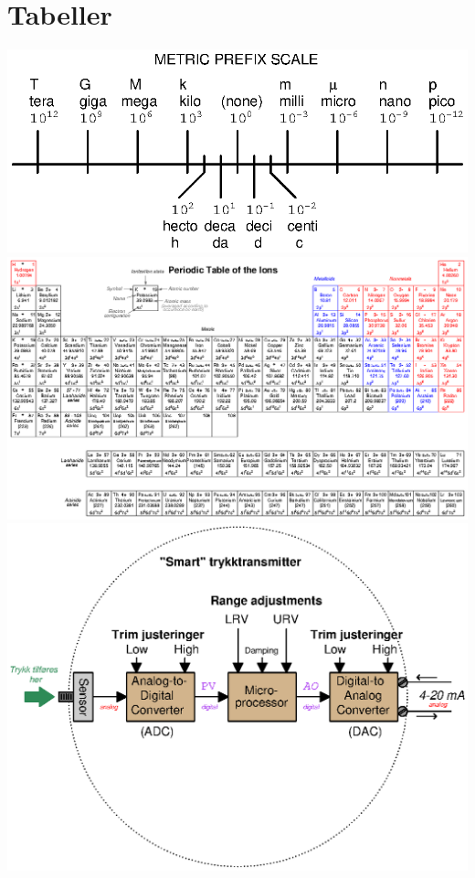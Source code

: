 
\section{Tabeller}
\includegraphics[width=1\textwidth]{002.eps}
\vfil \eject
\includegraphics[angle=90,height=1\textheight]{./chemistry12.eps}
\vfil \eject
\includegraphics[width=1\textwidth]{calibrate03.eps}
